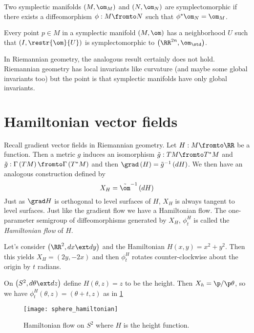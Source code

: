 \documentclass{amsart}
\begin{document}
\begin{defn}
Two symplectic manifolds $\left( M , \om_M \right)$ and $\left( N , \om_N \right)$
are symplectomorphic if there exists a diffeomorphism $\phi:M\fromto N$ such that
$\phi^* \om_N = \om_M$. 
\end{defn}

\begin{thm}[Darboux]
Every point $p\in M$ in a symplectic manifold $\left( M , \om \right)$ has a neighborhood
$U$ such that $\left( I , \restr{\om}{U} \right)$ is symplectomorphic to 
$\left( \RR^{2n} , \om_\std \right)$.
\end{thm}

\begin{rmk}
In Riemannian geometry, the analogous result certainly does not hold.
Riemannian geometry has local invariants like curvature (and maybe some global invariants too)
but the point is that symplectic manifolds have only global invariants.
\end{rmk}

\section{Hamiltonian vector fields}

Recall gradient vector fields in Riemannian geometry.
Let $H:M\fromto \RR$ be a function.
Then a metric $g$ induces an isomorphism $\tilde g : TM \fromto T^*M$
and $\tilde g: \Gamma\left( TM \right) \fromto \Gamma\left( T^*M \right)$
and then $\grad\left( H \right) = \tilde g^{-1}\left( dH \right)$.
We then have an analogous construction defined by
\begin{equation}
X_H = \tilde \om^{-1}\left( dH \right)
\end{equation}
Just as $\grad H$ is orthogonal to level surfaces of $H$,
$X_H$ is always tangent to level surfaces.
Just like the gradient flow we have a Hamiltonian flow. 
The one-parameter semigroup of diffeomorphisms 
generated by $X_H$, $\phi_t^H$ is called the \emph{Hamiltonian flow} of $H$. 

\begin{exm}
Let's consider $\left( \RR^2 , dx \ext dy \right)$ and the Hamiltonian
$H\left( x , y \right)= x^2 + y^2$. 
Then this yields $X_H = \left( 2y , -2x \right)$ and then $\phi_t^H$ 
rotates counter-clockwise about the origin by $t$ radians. 
\end{exm}

\begin{exm}
On $\left( S^2 , d\theta \ext dz  \right)$ define $H\left( \theta , z \right) = z$ 
to be the height. Then $X_h = \p / \p \theta$, so we have
$\phi_t^H\left( \theta , z \right) = \left( \theta  + t , z \right)$ as in \cref{fig:sphere_hamiltonian}
\begin{figure}
\centering
\texttt{[image: sphere\_hamiltonian]}
\caption{Hamiltonian flow on $S^2$ where $H$ is the height function.}
\label{fig:sphere_hamiltonian}
\end{figure}
\end{exm}
\end{document}
